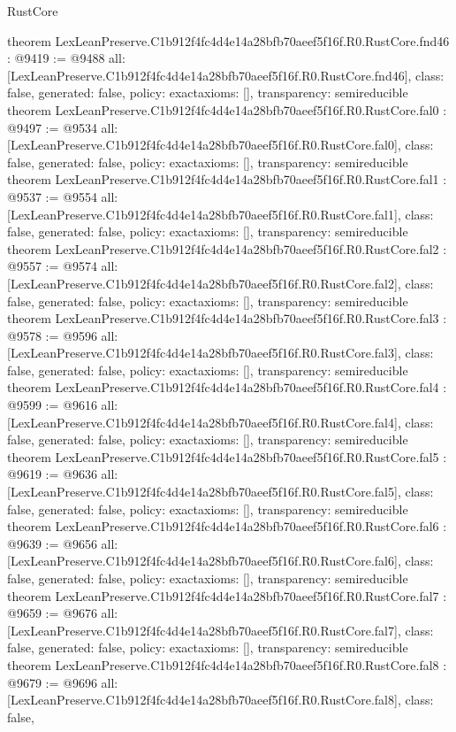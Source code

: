 \begin{lexlean}{RustCore}
\begin{coremodule}
{}
theorem LexLeanPreserve.C1b912f4fc4d4e14a28bfb70aeef5f16f.R0.RustCore.fnd46 : @9419 := @9488 {
  all: [LexLeanPreserve.C1b912f4fc4d4e14a28bfb70aeef5f16f.R0.RustCore.fnd46],
  class: false,
  generated: false,
  policy: exact{axioms: []},
  transparency: semireducible
}
theorem LexLeanPreserve.C1b912f4fc4d4e14a28bfb70aeef5f16f.R0.RustCore.fal0 : @9497 := @9534 {
  all: [LexLeanPreserve.C1b912f4fc4d4e14a28bfb70aeef5f16f.R0.RustCore.fal0],
  class: false,
  generated: false,
  policy: exact{axioms: []},
  transparency: semireducible
}
theorem LexLeanPreserve.C1b912f4fc4d4e14a28bfb70aeef5f16f.R0.RustCore.fal1 : @9537 := @9554 {
  all: [LexLeanPreserve.C1b912f4fc4d4e14a28bfb70aeef5f16f.R0.RustCore.fal1],
  class: false,
  generated: false,
  policy: exact{axioms: []},
  transparency: semireducible
}
theorem LexLeanPreserve.C1b912f4fc4d4e14a28bfb70aeef5f16f.R0.RustCore.fal2 : @9557 := @9574 {
  all: [LexLeanPreserve.C1b912f4fc4d4e14a28bfb70aeef5f16f.R0.RustCore.fal2],
  class: false,
  generated: false,
  policy: exact{axioms: []},
  transparency: semireducible
}
theorem LexLeanPreserve.C1b912f4fc4d4e14a28bfb70aeef5f16f.R0.RustCore.fal3 : @9578 := @9596 {
  all: [LexLeanPreserve.C1b912f4fc4d4e14a28bfb70aeef5f16f.R0.RustCore.fal3],
  class: false,
  generated: false,
  policy: exact{axioms: []},
  transparency: semireducible
}
theorem LexLeanPreserve.C1b912f4fc4d4e14a28bfb70aeef5f16f.R0.RustCore.fal4 : @9599 := @9616 {
  all: [LexLeanPreserve.C1b912f4fc4d4e14a28bfb70aeef5f16f.R0.RustCore.fal4],
  class: false,
  generated: false,
  policy: exact{axioms: []},
  transparency: semireducible
}
theorem LexLeanPreserve.C1b912f4fc4d4e14a28bfb70aeef5f16f.R0.RustCore.fal5 : @9619 := @9636 {
  all: [LexLeanPreserve.C1b912f4fc4d4e14a28bfb70aeef5f16f.R0.RustCore.fal5],
  class: false,
  generated: false,
  policy: exact{axioms: []},
  transparency: semireducible
}
theorem LexLeanPreserve.C1b912f4fc4d4e14a28bfb70aeef5f16f.R0.RustCore.fal6 : @9639 := @9656 {
  all: [LexLeanPreserve.C1b912f4fc4d4e14a28bfb70aeef5f16f.R0.RustCore.fal6],
  class: false,
  generated: false,
  policy: exact{axioms: []},
  transparency: semireducible
}
theorem LexLeanPreserve.C1b912f4fc4d4e14a28bfb70aeef5f16f.R0.RustCore.fal7 : @9659 := @9676 {
  all: [LexLeanPreserve.C1b912f4fc4d4e14a28bfb70aeef5f16f.R0.RustCore.fal7],
  class: false,
  generated: false,
  policy: exact{axioms: []},
  transparency: semireducible
}
theorem LexLeanPreserve.C1b912f4fc4d4e14a28bfb70aeef5f16f.R0.RustCore.fal8 : @9679 := @9696 {
  all: [LexLeanPreserve.C1b912f4fc4d4e14a28bfb70aeef5f16f.R0.RustCore.fal8],
  class: false,
}
\end{coremodule}
\end{lexlean}
